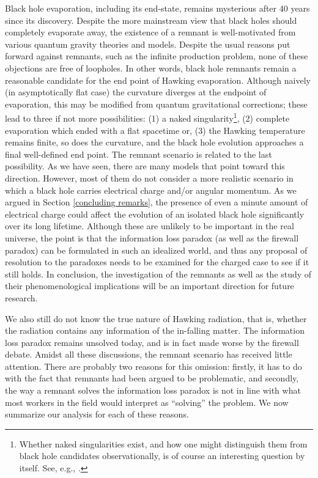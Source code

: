 \documentclass[12pt]{article}
\newcommand{\2}{$^2$}
\newcommand{\3}{$^3$}
\newcommand{\4}{$_4$}
\newcommand{\5}{$_5$}
\begin{document}
Black hole evaporation, including its end-state, remains mysterious after 40 years since its discovery. Despite the more mainstream view that black holes should completely evaporate away, the existence of a remnant is well-motivated from various quantum gravity theories and models. Despite the usual reasons put forward against remnants, such as the infinite production problem, none of these objections are free of loopholes. In other words, black hole remnants remain a 
reasonable candidate for the end point of Hawking evaporation. Although naively (in asymptotically flat case) the curvature diverges at the endpoint of evaporation, this may be modified from quantum gravitational corrections; these lead to three if not more possibilities: (1) a naked singularity\footnote{{\color{black}Whether naked singularities exist, and how one might distinguish them from black hole candidates observationally, is of course an interesting question by itself. See, e.g., \cite{0710.2333, 1206.3077}.}}, (2) complete evaporation which ended with a flat spacetime or, (3) the Hawking temperature remains finite, so does the curvature, and the black hole evolution approaches a final well-defined end point. The remnant scenario is related to the last possibility. As we have seen, there are many models that point toward this direction. However, most of them do not consider a more realistic scenario in which a black hole carries electrical charge and/or angular momentum. As we argued in Section \ref{concluding remarks}, the presence of even a minute amount of electrical charge could affect the evolution of an isolated black hole significantly over its long lifetime. Although these are unlikely to be important in the real universe, the point is that the information loss paradox (as well as the firewall paradox) can be formulated in such an idealized world, and thus any proposal of resolution to the paradoxes needs to be examined for the charged case to see if it still holds.  
In conclusion, the investigation of the remnants as well as the study of their phenomenological implications will be an important direction for future research.

We also still do not know the true nature of Hawking radiation, that is, whether the radiation contains any information of the in-falling matter. The information loss paradox remains unsolved today, and is in fact made worse by the firewall debate. Amidst all these discussions, the remnant scenario has received little attention. There are probably two reasons for this omission: firstly, it has to do with the fact that remnants had been argued to be problematic, and secondly, the way a remnant solves the information loss paradox is not in line with what most workers in the field would interpret as ``solving'' the problem. We now summarize our analysis for each of these reasons.
\end{document}
